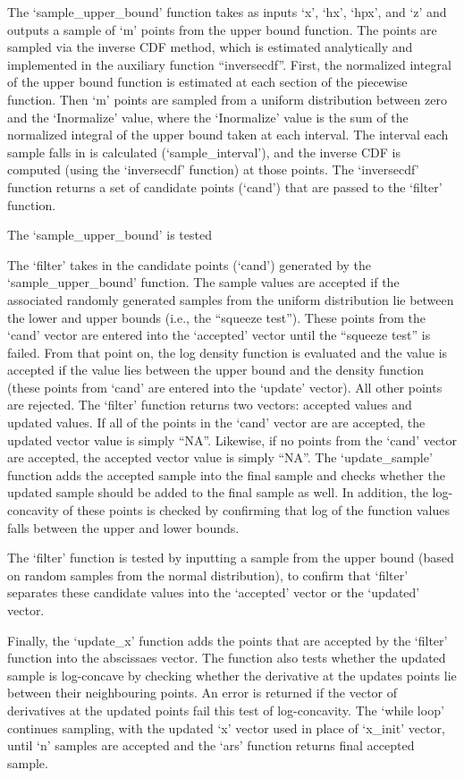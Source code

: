 \documentclass{article}
\begin{document}
The `sample\_upper\_bound' function takes as inputs `x', `hx', `hpx', and `z' and outputs a sample of `m' points from the upper bound function. The points are sampled via the inverse CDF method, which is estimated analytically and implemented in the auxiliary function ``inversecdf''. First, the normalized integral of the upper bound function is estimated at each section of the piecewise function. Then `m' points are sampled from a uniform distribution between zero and the `Inormalize' value, where the `Inormalize' value is the sum of the normalized integral of the upper bound taken at each interval.  The interval each sample falls in is calculated (`sample\_interval'), and the inverse CDF is computed (using the `inversecdf' function) at those points. The `inversecdf' function returns a set of candidate points (`cand') that are passed to the `filter' function.

The `sample\_upper\_bound' is tested 

The `filter' takes in the candidate points (`cand') generated by the `sample\_upper\_bound' function.  The sample values are accepted if the associated randomly generated samples from the uniform distribution lie between the lower and upper bounds (i.e., the ``squeeze test'').  These points from the `cand' vector are entered into the `accepted' vector until the ``squeeze test'' is failed.  From that point on, the log density function is evaluated and the value is accepted if the value lies between the upper bound and the density function (these points from `cand' are entered into the `update' vector).  All other points are rejected. The `filter' function returns two vectors: accepted values and updated values.  If all of the points in the `cand' vector are are accepted, the updated vector value is simply ``NA''.  Likewise, if no points from the `cand' vector are accepted, the accepted vector value is simply ``NA''.  The `update\_sample' function adds the accepted sample into the final sample and checks whether the updated sample should be added to the final sample as well.  In addition, the log-concavity of these points is checked by confirming that log of the function values falls between the upper and lower bounds. 

The `filter' function is tested by inputting a sample from the upper bound (based on random samples from the normal distribution), to confirm that `filter' separates these candidate values into the `accepted' vector or the `updated' vector.

Finally, the `update\_x' function adds the points that are accepted by the `filter' function into the abscissaes vector.  The function also tests whether the updated sample is log-concave by checking whether the derivative at the updates points lie between their neighbouring points.  An error is returned if the vector of derivatives at the updated points fail this test of log-concavity. The `while loop' continues sampling, with the updated `x' vector used in place of `x\_init' vector, until `n' samples are accepted and the `ars' function returns final accepted sample.
\end{document}
